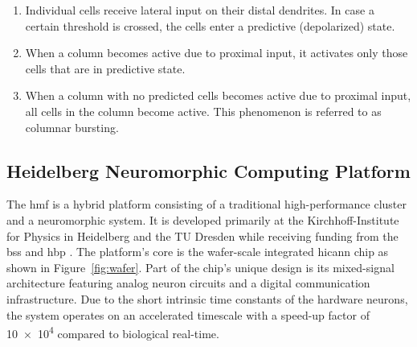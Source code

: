 \begin{enumerate}

	\item Individual cells receive lateral input on their distal dendrites. In
	case a certain threshold is crossed, the cells enter a predictive
	(depolarized) state.

	\item\label{enm:temporal_memory_predictive} When a column becomes active due
	to proximal input, it activates only those cells that are in predictive state.

	\item\label{enm:temporal_memory_bursting} When a column with no predicted
	cells becomes active due to proximal input, all cells in the column become
	active. This
	phenomenon is referred to as columnar bursting.

\end{enumerate}

\subsection{Heidelberg Neuromorphic Computing Platform}

The \gls{hmf} is a hybrid platform consisting of a traditional high-performance
cluster and a neuromorphic system. It is developed primarily at the
Kirchhoff-Institute for Physics in Heidelberg and the TU Dresden while receiving
funding from the \gls{bss} and \gls{hbp} \citep{hbp2014sp9spec}. The platform's
core is the wafer-scale integrated \gls{hicann} chip as shown in
Figure~\ref{fig:wafer}. Part of the chip's unique design is its mixed-signal
architecture featuring analog neuron circuits and a digital communication
infrastructure. Due to the short intrinsic time constants of the hardware
neurons, the system operates on an accelerated timescale with a speed-up factor
of \num{10e4} compared to biological real-time.

